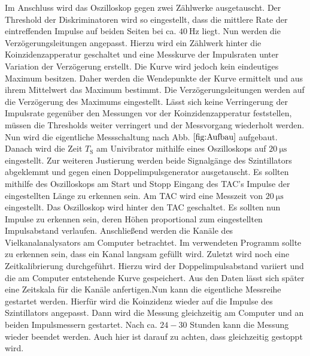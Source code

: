  Im Anschluss wird das Oszilloskop gegen zwei Zählwerke ausgetauscht. Der Threshold der Diskriminatoren wird so eingestellt, dass die mittlere Rate der eintreffenden Impulse auf beiden Seiten bei ca. $\SI{40}{\hertz}$ liegt. Nun werden die Verzögerungsleitungen angepasst. Hierzu wird ein Zählwerk hinter die Koinzidenzapperatur geschaltet und eine Messkurve der Impulsraten unter Variation der Verzögerung erstellt. Die Kurve wird jedoch kein eindeutiges Maximum besitzen. Daher werden die Wendepunkte der Kurve ermittelt und aus ihrem Mittelwert das Maximum bestimmt. Die Verzögerungsleitungen werden auf die Verzögerung des Maximums eingestellt. Lässt sich keine Verringerung der Impulsrate gegenüber den Messungen vor der Koinzidenzapperatur feststellen, müssen die Thresholds weiter verringert und der Messvorgang wiederholt werden. Nun wird die eigentliche Messschaltung nach Abb. $\ref{fig:Aufbau}$ aufgebaut. Danach wird die Zeit $T_\text{S}$ am Univibrator mithilfe eines Oszilloskops auf $\SI{20}{\micro\second}$ eingestellt. Zur weiteren Justierung werden beide Signalgänge des Szintillators abgeklemmt und gegen einen Doppelimpulsgenerator ausgetauscht. Es sollten mithilfe des Oszilloskops am Start und Stopp Eingang des TAC's Impulse der eingestellten Länge zu erkennen sein. Am TAC wird eine Messzeit von $\SI{20}{\micro\second}$ eingestellt. Das Oszilloskop wird hinter den TAC geschaltet. Es sollten nun Impulse zu erkennen sein, deren Höhen proportional zum eingestellten Impulsabstand verlaufen. Anschließend werden die Kanäle des Vielkanalanalysators am Computer betrachtet. Im verwendeten Programm sollte zu erkennen sein, dass ein Kanal langsam gefüllt wird. Zuletzt wird noch eine Zeitkalibrierung durchgeführt. Hierzu wird der Doppelimpulsabstand variiert und die am Computer entstehende Kurve gespeichert. Aus den Daten lässt sich später eine Zeitskala für die Kanäle anfertigen.Nun kann die eigentliche Messreihe gestartet werden. Hierfür wird die Koinzidenz wieder auf die Impulse des Szintillators angepasst. Dann wird die Messung gleichzeitig am Computer und an beiden Impulsmessern gestartet. Nach ca. $24-30$ Stunden kann die Messung wieder beendet werden. Auch hier ist darauf zu achten, dass gleichzeitig gestoppt wird.  